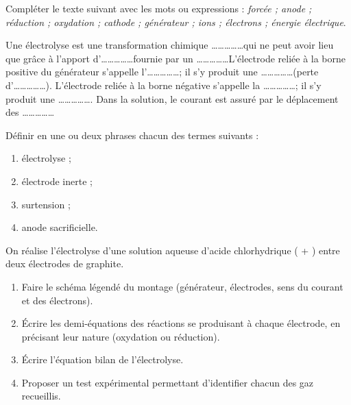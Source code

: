 \documentclass[11pt]{article}
\newcounter{popsec}
\newcounter{popsub}
\newcommand{\courssub}[1]{%
  \stepcounter{popsub}%
  \par\vspace{9pt}\noindent{\popxbold\fontsize{11.5}{13}\selectfont\color{popink}{\color{poporange}\thepopsec.\thepopsub}\hspace{6pt}#1}\par\nopagebreak\vspace{4pt}
}
\begin{document}
\begin{exercice}
Compléter le texte suivant avec les mots ou expressions : \emph{forcée ; anode ; réduction ; oxydation ; cathode ; générateur ; ions ; électrons ; énergie électrique}.

Une électrolyse est une transformation chimique \ldots\ldots\ldots\ldots\ldots qui ne peut avoir lieu que grâce à l'apport d'\ldots\ldots\ldots\ldots\ldots fournie par un \ldots\ldots\ldots\ldots\ldots L'électrode reliée à la borne positive du générateur s'appelle l'\ldots\ldots\ldots\ldots\ldots ; il s'y produit une \ldots\ldots\ldots\ldots\ldots (perte d'\ldots\ldots\ldots\ldots\ldots). L'électrode reliée à la borne négative s'appelle la \ldots\ldots\ldots\ldots\ldots ; il s'y produit une \ldots\ldots\ldots\ldots\ldots. Dans la solution, le courant est assuré par le déplacement des \ldots\ldots\ldots\ldots\ldots
\end{exercice}

\begin{exercice}
Définir en une ou deux phrases chacun des termes suivants :
\begin{enumerate}
\item électrolyse ;
\item électrode inerte ;
\item surtension ;
\item anode sacrificielle.
\end{enumerate}
\end{exercice}

\courssub{Je m'entraîne}

\begin{exercice}
On réalise l'électrolyse d'une solution aqueuse d'acide chlorhydrique ( + ) entre deux électrodes de graphite.
\begin{enumerate}
\item Faire le schéma légendé du montage (générateur, électrodes, sens du courant et des électrons).
\item Écrire les demi-équations des réactions se produisant à chaque électrode, en précisant leur nature (oxydation ou réduction).
\item Écrire l'équation bilan de l'électrolyse.
\item Proposer un test expérimental permettant d'identifier chacun des gaz recueillis.
\end{enumerate}
\end{exercice}
\end{document}
